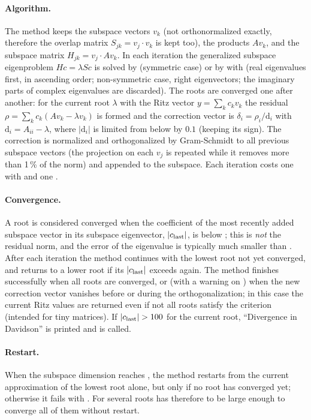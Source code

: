 \paragraph{Algorithm.} The method keeps the subspace vectors $v_k$ (not orthonormalized exactly, therefore the overlap matrix
$S_{jk}=v_j\cdot v_k$ is kept too), the products $Av_k$, and the subspace matrix $H_{jk}=v_j\cdot Av_k$. In each iteration the
generalized subspace eigenproblem $Hc=\lambda Sc$ is solved by  (symmetric case) or by 
with  (real eigenvalues first, in ascending order; non-symmetric case, right eigenvectors; the imaginary parts
of complex eigenvalues are discarded). The roots are converged one after another: for the current root $\lambda$ with the
Ritz vector $y=\sum_kc_kv_k$ the residual $\rho=\sum_kc_k(Av_k-\lambda v_k)$ is formed and the correction vector is
$\delta_i=\rho_i/\mathrm{d}_i$ with $\mathrm{d}_i=A_{ii}-\lambda$, where $|\mathrm{d}_i|$ is limited from below by $0.1$
(keeping its sign). The correction is normalized and orthogonalized by Gram-Schmidt to all previous subspace vectors (the
projection on each $v_j$ is repeated while it removes more than 1\,\% of the norm) and appended to the subspace. Each iteration
costs one  with  and one .

\paragraph{Convergence.} A root is considered converged when the coefficient of the most recently added subspace vector in its
subspace eigenvector, $|c_{\rm last}|$, is below ; this is \emph{not} the residual norm, and the error of the
eigenvalue is typically much smaller than . After each iteration the method continues with the lowest root not yet
converged, and returns to a lower root if its $|c_{\rm last}|$ exceeds  again. The method finishes successfully when
all  roots are converged, or (with a warning on ) when the new correction vector vanishes before or
during the orthogonalization; in this case the current Ritz values are returned even if not all roots satisfy the criterion
(intended for tiny matrices). If $|c_{\rm last}|>100$ for the current root, ``Divergence in Davidson'' is printed and
 is called.

\paragraph{Restart.} When the subspace dimension reaches , the method restarts from the current approximation
of the lowest root alone, but only if no root has converged yet; otherwise it fails with . For several roots
 has therefore to be large enough to converge all of them without restart.

